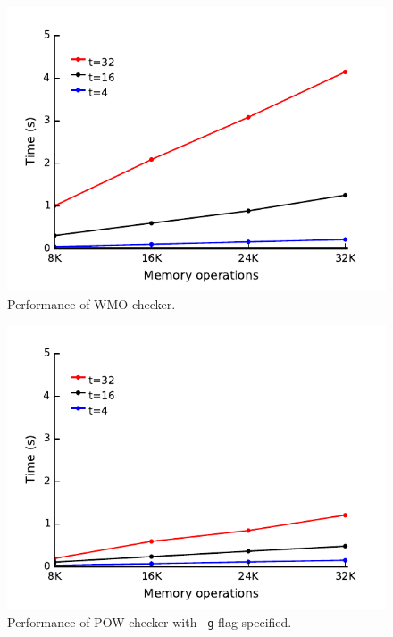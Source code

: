 \documentclass[11pt]{article}
\begin{document}
\begin{figure}
\begin{center}
\includegraphics{performance/wmo.pdf}
\end{center}
\caption{Performance of WMO checker.}
\label{Graph:WMO}
\end{figure}

\begin{figure}
\begin{center}
\includegraphics{performance/pow.pdf}
\end{center}
\caption{Performance of POW checker with \texttt{-g} flag specified.}
\label{Graph:POW}
\end{figure}
\end{document}
